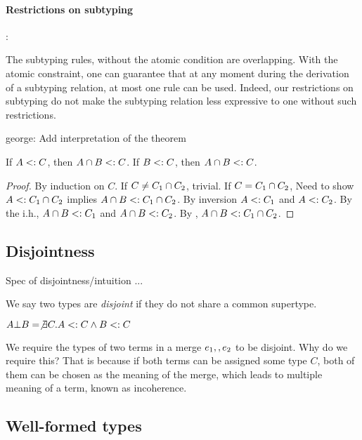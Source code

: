\documentclass[nocopyrightspace,preprint,times,9pt]{sigplanconf}
\newcommand{\authornote}[3]{{\color{#2} {\sc #1}: #3}}
\newcommand\george[1]{\authornote{george}{blue}{#1}}
\begin{document}
\paragraph{Restrictions on subtyping}:

The subtyping rules, without the atomic condition are overlapping. With the atomic constraint, one can guarantee that at any moment during the derivation of a subtyping relation, at most one rule can be used. Indeed, our restrictions on subtyping do not make the subtyping relation less expressive to one without such restrictions.

\george{Add interpretation of the theorem}

\begin{theorem}
  If $A <: C$, then $A \cap B <: C$.
  If $B <: C$, then $A \cap B <: C$.
\end{theorem}

\begin{proof}
  By induction on $C$.
  If $C \neq C_1 \cap C_2$, trivial.
  If $C = C_1 \cap C_2$,
  Need to show $A <: C_1 \cap C_2$ implies $A \cap B <: C_1 \cap C_2$.
  By inversion $A <: C_1$ and $A <: C_2$.
  By the i.h., $A \cap B <: C_1$ and $A \cap B <: C_2$.
  By , $A \cap B <: C_1 \cap C_2$.
\end{proof}

\subsection{Disjointness}

Spec of disjointness/intuition ...

We say two types are \emph{disjoint} if they do not share a common supertype.

\begin{definition}[Disjointness]
$A \bot B = \not \exists C. A <: C \wedge B <: C$
\end{definition}

We require the types of two terms in a merge $e_1 ,, e_2$ to be disjoint. Why do we require this? That is because if both terms can be assigned some type $C$, both of them can be chosen as the meaning of the merge, which leads to multiple meaning of a term, known as incoherence.

\subsection{Well-formed types}
\end{document}
